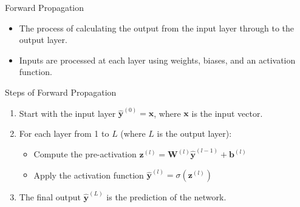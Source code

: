 \documentclass[aspectratio=169]{../latex_main/tntbeamer}  %
\begin{document}
  	\begin{frame}{Forward Propagation}

        \begin{itemize}
            \item The process of calculating the output from the input layer through to the output layer.
            \item Inputs are processed at each layer using weights, biases, and an activation function.
        \end{itemize}

        
        \begin{block}{Steps of Forward Propagation}
        \begin{enumerate}
            \item Start with the input layer \( \hat{\textbf{y}}^{(0)} = \textbf{x} \), where \( \textbf{x} \) is the input vector.
            \item For each layer from 1 to \( L \) (where \( L \) is the output layer):
                \begin{itemize}
                    \item Compute the pre-activation \( \textbf{z}^{(l)} = \textbf{W}^{(l)} \hat{\textbf{y}}^{(l-1)} + \textbf{b}^{(l)} \)
                    \item Apply the activation function \( \hat{\textbf{y}}^{(l)} = \sigma(\textbf{z}^{(l)}) \)
                \end{itemize}
            \item The final output \( \hat{\textbf{y}}^{(L)} \) is the prediction of the network.
        \end{enumerate}
        \end{block}
                
	  \end{frame}
\end{document}
